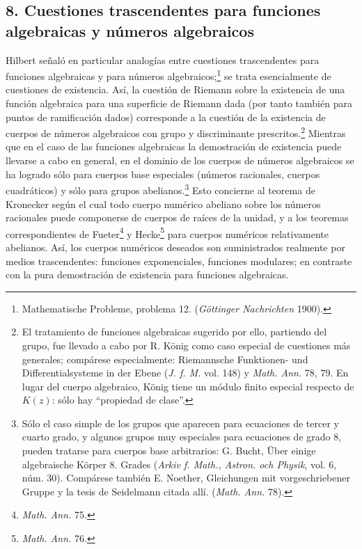 \documentclass[11pt]{article}
\begin{document}
\subsection*{8. Cuestiones trascendentes para funciones algebraicas y números algebraicos}
Hilbert señaló en particular analogías entre cuestiones trascendentes para funciones algebraicas y para números algebraicos;\footnote{Mathematische Probleme, problema 12. (\emph{Göttinger Nachrichten} 1900).} se trata esencialmente de cuestiones de existencia. Así, la cuestión de Riemann sobre la existencia de una función algebraica para una superficie de Riemann dada (por tanto también para puntos de ramificación dados) corresponde a la cuestión de la existencia de cuerpos de números algebraicos con grupo y discriminante prescritos.\footnote{El tratamiento de funciones algebraicas sugerido por ello, partiendo del grupo, fue llevado a cabo por R. König como caso especial de cuestiones más generales; compárese especialmente: Riemannsche Funktionen- und Differentialsysteme in der Ebene (\emph{J. f. M.} vol. 148) y \emph{Math. Ann.} 78, 79. En lugar del cuerpo algebraico, König tiene un módulo finito especial respecto de \(K(z)\): sólo hay ``propiedad de clase''.} Mientras que en el caso de las funciones algebraicas la demostración de existencia puede llevarse a cabo en general, en el dominio de los cuerpos de números algebraicos se ha logrado sólo para cuerpos base especiales (números racionales, cuerpos cuadráticos) y sólo para grupos abelianos.\footnote{Sólo el caso simple de los grupos que aparecen para ecuaciones de tercer y cuarto grado, y algunos grupos muy especiales para ecuaciones de grado 8, pueden tratarse para cuerpos base arbitrarios: G. Bucht, Über einige algebraische Körper 8. Grades (\emph{Arkiv f. Math., Astron. och Physik}, vol. 6, núm. 30). Compárese también E. Noether, Gleichungen mit vorgeschriebener Gruppe y la tesis de Seidelmann citada allí. (\emph{Math. Ann.} 78).} Esto concierne al teorema de Kronecker según el cual todo cuerpo numérico abeliano sobre los números racionales puede componerse de cuerpos de raíces de la unidad, y a los teoremas correspondientes de Fueter\footnote{\emph{Math. Ann.} 75.} y Hecke\footnote{\emph{Math. Ann.} 76.} para cuerpos numéricos relativamente abelianos. Así, los cuerpos numéricos deseados son suministrados realmente por medios trascendentes: funciones exponenciales, funciones modulares; en contraste con la pura demostración de existencia para funciones algebraicas.
\end{document}
